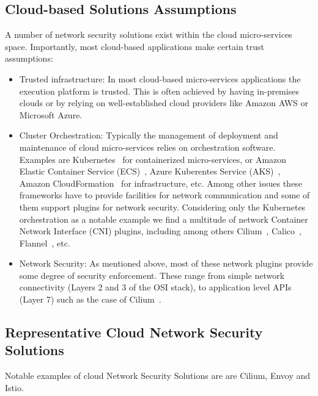 \documentclass[a4paper]{article}
\begin{document}
\subsection{Cloud-based Solutions Assumptions}
\label{sec:cloud-sol}

A number of network security solutions exist within the cloud
micro-services space.
%
Importantly, most cloud-based applications make certain trust
assumptions:
\begin{itemize}
\item {\sc Trusted infrastructure:}
  In most cloud-based micro-services applications the execution
  platform is trusted.
  This is often achieved by having in-premises clouds or by relying on
  well-established cloud providers like Amazon AWS or Microsoft Azure.
\item {\sc Cluster Orchestration:}
  Typically the management of deployment and maintenance of cloud
  micro-services relies on orchestration software.
  Examples are Kubernetes~\cite{kubernetes} for containerized
  micro-services, or Amazon Elastic Container Service
  (ECS)~\cite{aws-ecs}, Azure Kuberentes Service
  (AKS)~\cite{azure-aks}, Amazon
  CloudFormation~\cite{aws-cloudformation} for infrastructure, etc.
  Among other issues these frameworks have to provide facilities for
  network communication and some of them support plugins for network
  security.
  Considering only the Kubernetes orchestration as a notable example
  we find a multitude of network Container Network Interface (CNI)
  plugins, including among others Cilium~\cite{cilium},
  Calico~\cite{calico}, Flannel~\cite{flannel}, etc. 
\item {\sc Network Security:}
  As mentioned above, most of these network plugins provide some
  degree of security enforcement.
  These range from simple network connectivity (Layers 2 and 3 of the
  OSI stack), to application level APIs (Layer 7) such as the case of
  Cilium~\cite{cilium}. 
\end{itemize}

\subsection{Representative Cloud Network Security Solutions}
\label{sec:repr-cloud-netw}

Notable examples of cloud Network Security Solutions are  are Cilium,
Envoy and Istio.
\end{document}
